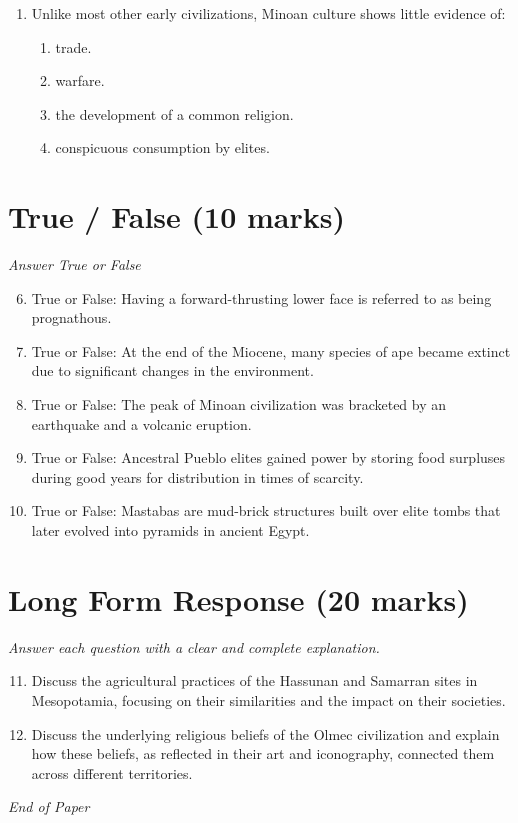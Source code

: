 \documentclass[12pt]{article}
\begin{document}
\begin{enumerate}[label=\arabic*.]
\begin{enumerate}[label=(\alph*)]
    \item requires metal and a source of heat to be forged
    \item requires many more flakes to be removed.
\end{enumerate}
\item Unlike most other early civilizations, Minoan culture shows little evidence of:
\begin{enumerate}[label=(\alph*)]
    \item trade.
    \item warfare.
    \item the development of a common religion.
    \item conspicuous consumption by elites.
\end{enumerate}
\end{enumerate}

\section*{True / False (10 marks)}
\textit{Answer True or False}
\begin{enumerate}[label=\arabic*.]
\setcounter{enumi}{5}
\item True or False: Having a forward-thrusting lower face is referred to as being prognathous.
\item True or False: At the end of the Miocene, many species of ape became extinct due to significant changes in the environment.
\item True or False: The peak of Minoan civilization was bracketed by an earthquake and a volcanic eruption.
\item True or False: Ancestral Pueblo elites gained power by storing food surpluses during good years for distribution in times of scarcity.
\item True or False: Mastabas are mud-brick structures built over elite tombs that later evolved into pyramids in ancient Egypt.
\end{enumerate}

\section*{Long Form Response (20 marks)}
\textit{Answer each question with a clear and complete explanation.}
\begin{enumerate}[label=\arabic*.]
\setcounter{enumi}{10}
\item Discuss the agricultural practices of the Hassunan and Samarran sites in Mesopotamia, focusing on their similarities and the impact on their societies.
\item Discuss the underlying religious beliefs of the Olmec civilization and explain how these beliefs, as reflected in their art and iconography, connected them across different territories.
\end{enumerate}

\vfill
\noindent\textit{End of Paper}
\end{document}
